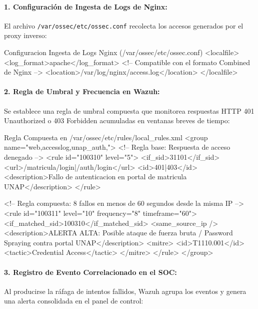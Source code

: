 \paragraph{1. Configuración de Ingesta de Logs de Nginx:}
El archivo \texttt{/var/ossec/etc/ossec.conf} recolecta los accesos generados por el proxy inverso:

\begin{cmdbox}{Configuracion Ingesta de Logs Nginx (/var/ossec/etc/ossec.conf)}
<localfile>
  <log_format>apache</log_format> <!-- Compatible con el formato Combined de Nginx -->
  <location>/var/log/nginx/access.log</location>
</localfile>
\end{cmdbox}

\paragraph{2. Regla de Umbral y Frecuencia en Wazuh:}
Se establece una regla de umbral compuesta que monitorea respuestas HTTP 401 Unauthorized o 403 Forbidden acumuladas en ventanas breves de tiempo:

\begin{cmdbox}{Regla Compuesta en /var/ossec/etc/rules/local\_rules.xml}
<group name="web,accesslog,unap_auth,">
  <!-- Regla base: Respuesta de acceso denegado -->
  <rule id="100310" level="5">
    <if_sid>31101</if_sid>
    <url>/matricula/login|/auth/login</url>
    <id>401|403</id>
    <description>Fallo de autenticacion en portal de matricula UNAP</description>
  </rule>

  <!-- Regla compuesta: 8 fallos en menos de 60 segundos desde la misma IP -->
  <rule id="100311" level="10" frequency="8" timeframe="60">
    <if_matched_sid>100310</if_matched_sid>
    <same_source_ip />
    <description>ALERTA ALTA: Posible ataque de fuerza bruta / Password Spraying contra portal UNAP</description>
    <mitre>
      <id>T1110.001</id>
      <tactic>Credential Access</tactic>
    </mitre>
  </rule>
</group>
\end{cmdbox}

\newpage
\paragraph{3. Registro de Evento Correlacionado en el SOC:}
Al producirse la ráfaga de intentos fallidos, Wazuh agrupa los eventos y genera una alerta consolidada en el panel de control:

